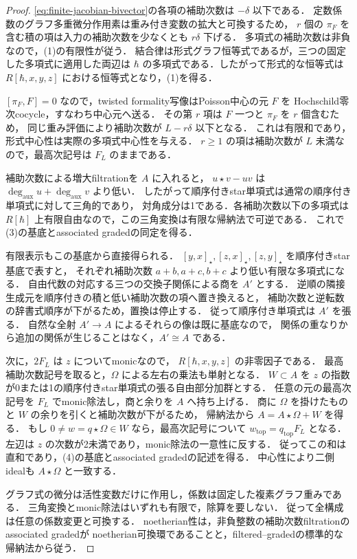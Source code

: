 \begin{proof}
\eqref{eq:finite-jacobian-bivector}の各項の補助次数は $-\delta$ 以下である．
定数係数のグラフ多重微分作用素は重み付き変数の拡大と可換するため，
$r$ 個の $\pi_F$ を含む積の項は入力の補助次数を少なくとも $r\delta$ 下げる．
多項式の補助次数は非負なので，(1)の有限性が従う．
結合律は形式グラフ恒等式であるが，三つの固定した多項式に適用した両辺は
$\hbar$ の多項式である．したがって形式的な恒等式は
$R[\hbar,x,y,z]$ における恒等式となり，(1)を得る．

$[\pi_F,F]=0$ なので，twisted formality写像はPoisson中心の元 $F$ を
Hochschild零次cocycle，すなわち中心元へ送る\cite{Kontsevich}．
その第 $r$ 項は $F$ 一つと $\pi_F$ を $r$ 個含むため，
同じ重み評価により補助次数が $L-r\delta$ 以下となる．
これは有限和であり，形式中心性は実際の多項式中心性を与える．
$r\ge1$ の項は補助次数が $L$ 未満なので，最高次記号は $F_L$ のままである．

補助次数による増大filtrationを $A$ に入れると，
$u\star v-uv$ は $\deg_{\mathrm{aux}}u+\deg_{\mathrm{aux}}v$ より低い．
したがって順序付きstar単項式は通常の順序付き単項式に対して三角的であり，
対角成分は1である．各補助次数以下の多項式は
$R[\hbar]$ 上有限自由なので，この三角変換は有限な帰納法で可逆である．
これで(3)の基底とassociated gradedの同定を得る．

有限表示もこの基底から直接得られる．
$[y,x]_\star,[z,x]_\star,[z,y]_\star$ を順序付きstar基底で表すと，
それぞれ補助次数 $a+b,a+c,b+c$ より低い有限な多項式になる．
自由代数の対応する三つの交換子関係による商を $A'$ とする．
逆順の隣接生成元を順序付きの積と低い補助次数の項へ置き換えると，
補助次数と逆転数の辞書式順序が下がるため，置換は停止する．
従って順序付き単項式は $A'$ を張る．
自然な全射 $A'\to A$ によるそれらの像は既に基底なので，
関係の重なりから追加の関係が生じることはなく，$A'\cong A$ である．

次に，$2F_L$ は $z$ についてmonicなので，
$R[\hbar,x,y,z]$ の非零因子である．
最高補助次数記号を取ると，$\Omega$ による左右の乗法も単射となる．
$W\subset A$ を $z$ の指数が0または1の順序付きstar単項式の張る自由部分加群とする．
任意の元の最高次記号を $F_L$ でmonic除法し，商と余りを $A$ へ持ち上げる．
商に $\Omega$ を掛けたものと $W$ の余りを引くと補助次数が下がるため，
帰納法から $A=A\star\Omega+W$ を得る．
もし $0\ne w=q\star\Omega\in W$ なら，最高次記号について
$w_{\mathrm{top}}=q_{\mathrm{top}}F_L$ となる．
左辺は $z$ の次数が2未満であり，monic除法の一意性に反する．
従ってこの和は直和であり，(4)の基底とassociated gradedの記述を得る．
中心性により二側idealも $A\star\Omega$ と一致する．

グラフ式の微分は活性変数だけに作用し，係数は固定した複素グラフ重みである．
三角変換とmonic除法はいずれも有限で，除算を要しない．
従って全構成は任意の係数変更と可換する．
noetherian性は，非負整数の補助次数filtrationのassociated gradedが
noetherian可換環であることと，filtered--gradedの標準的な帰納法から従う．
\end{proof}


